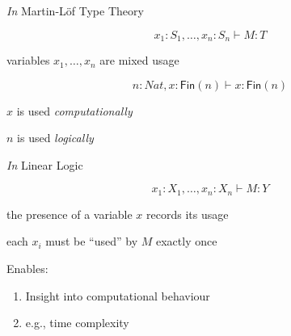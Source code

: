\documentclass[xetex,serif,mathserif,aspectratio=169]{beamer}
\begin{document}
\begin{frame}
  \emph{In} Martin-L{\"o}f Type Theory

  \bigskip

  \begin{displaymath}
    x_1 : S_1, \dots, x_n : S_n \vdash M : T
  \end{displaymath}

  \pause
  \bigskip

  \begin{center}
    variables $x_1, \dots, x_n$ are mixed usage
  \end{center}
\end{frame}

\begin{frame}
  \begin{displaymath}
    n : \mathit{Nat}, x : \mathsf{Fin}(n) \vdash x : \mathsf{Fin}(n)
  \end{displaymath}

  \pause
  \bigskip

  \hspace{15.5em}$x$ is used \textcolor{titlered}{\emph{computationally}}

  \pause
  \bigskip

  \hspace{12em}$n$ is used \textcolor{titlered}{\it logically}
\end{frame}

\begin{frame}
  \emph{In} Linear Logic

  \bigskip

  \begin{displaymath}
    x_1 : X_1, \dots, x_n : X_n \vdash M : Y
  \end{displaymath}

  \pause
  \bigskip

  \begin{center}
    the presence of a variable $x$ records its usage

    each $x_i$ must be ``used'' by $M$ exactly once
  \end{center}

  \pause
  \bigskip

  \begin{center}
    \begin{minipage}{0.6\linewidth}
      Enables:
      \begin{enumerate}
      \item Insight into computational behaviour
      \item e.g., time complexity
      \end{enumerate}
    \end{minipage}
  \end{center}
\end{frame}
\end{document}
